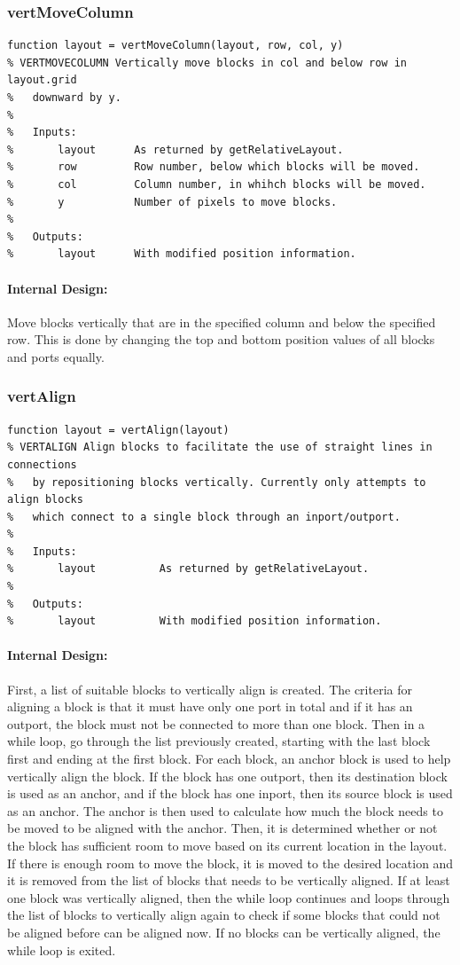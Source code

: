 \documentclass[12pt,letterpaper]{report}
\begin{document}
\subsubsection{vertMoveColumn}
\begin{lstlisting}
function layout = vertMoveColumn(layout, row, col, y)
% VERTMOVECOLUMN Vertically move blocks in col and below row in layout.grid
%   downward by y.
%
%   Inputs:
%       layout      As returned by getRelativeLayout.
%       row         Row number, below which blocks will be moved.
%       col         Column number, in whihch blocks will be moved.
%       y           Number of pixels to move blocks.
%
%   Outputs:
%       layout      With modified position information.
\end{lstlisting}
\paragraph{Internal Design:} Move blocks vertically that are in the specified column and below the specified row. This is done by changing the top and bottom position values of all blocks and ports equally.

\subsubsection{vertAlign}
\begin{lstlisting}
function layout = vertAlign(layout)
% VERTALIGN Align blocks to facilitate the use of straight lines in connections
%   by repositioning blocks vertically. Currently only attempts to align blocks
%   which connect to a single block through an inport/outport.
%
%   Inputs:
%       layout          As returned by getRelativeLayout.
%
%   Outputs:
%       layout          With modified position information.
\end{lstlisting}
\paragraph{Internal Design:} First, a list of suitable blocks to vertically align is created. The criteria for aligning a block is that it must have only one port in total and if it has an outport, the block must not be connected to more than one block. Then in a while loop, go through the list previously created, starting with the last block first and ending at the first block. For each block, an anchor block is used to help vertically align the block. If the block has one outport, then its destination block is used as an anchor, and if the block has one inport, then its source block is used as an anchor. The anchor is then used to calculate how much the block needs to be moved to be aligned with the anchor. Then, it is determined whether or not the block has sufficient room to move based on its current location in the layout. If there is enough room to move the block, it is moved to the desired location and it is removed from the list of blocks that needs to be vertically aligned. If at least one block was vertically aligned, then the while loop continues and loops through the list of blocks to vertically align again to check if some blocks that could not be aligned before can be aligned now. If no blocks can be vertically aligned, the while loop is exited.
\end{document}
